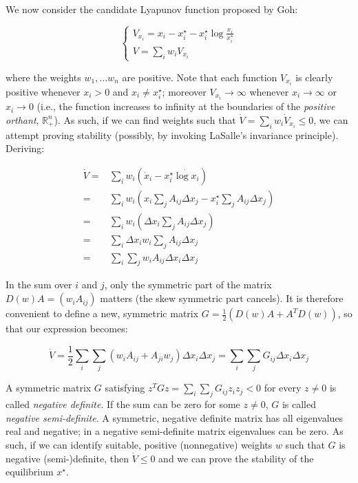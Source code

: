 \documentclass{article}
\begin{document}
We now consider the candidate Lyapunov function proposed by Goh:

\begin{equation}
\label{eq:goh}
\begin{cases}
V_{x_i} = x_i - x_i^\star - x_i^\star \log \frac{x_i}{x_i^\star}\\
V = \sum_i w_i V_{x_i}
\end{cases}
\end{equation}

where the weights \(w_1, \ldots w_n\) are positive. Note that each
function \(V_{x_i}\) is clearly positive whenever \(x_i > 0\) and
\(x_i \neq x_i^\star\); moreover \(V_{x_i} \to \infty\) whenever
\(x_i \to \infty\) or \(x_i \to 0\) (i.e., the function increases to
infinity at the boundaries of the \emph{positive orthant},
\(\mathbb R^n_+\)). As such, if we can find weights such that
\(\dot{V} = \sum_i w_i \dot{V}_{x_i} \leq 0\), we can attempt proving
stability (possibly, by invoking LaSalle's invariance principle).
Deriving:

\begin{equation}
\label{eq:gohstab}
\begin{aligned}
\dot{V} =& \sum_i w_i \left(\dot{x}_i - x_i^\star \dot{\log x_i} \right)\\
 =& \sum_i w_i \left(x_i \sum_{j} A_{ij} \Delta x_j - x_i^\star \sum_j A_{ij} \Delta x_j \right)\\
 =& \sum_i w_i \left(\Delta x_i \sum_{j} A_{ij} \Delta x_j \right)\\
 =& \sum_i \Delta x_i w_i \sum_j A_{ij} \Delta x_j\\
 =& \sum_i \sum_j w_i A_{ij} \Delta x_i \Delta x_j
\end{aligned}
\end{equation}

In the sum over \(i\) and \(j\), only the symmetric part of the matrix
\(D(w) A = (w_i A_{ij})\) matters (the skew symmetric part cancels). It
is therefore convenient to define a new, symmetric matrix
\(G =\frac{1}{2} (D(w)A + A^T D(w))\), so that our expression becomes:

\begin{equation}
\label{eq:stabcond}
\dot{V} = \frac{1}{2}\sum_i \sum_j (w_i A_{ij} + A_{ji} w_j) \Delta x_i \Delta x_j = \sum_i \sum_j G_{ij} \Delta x_i \Delta x_j
\end{equation}

A symmetric matrix \(G\) satisfying
\(z^T G z = \sum_i \sum_j G_{ij} z_i z_j < 0\) for every \(z \neq 0\) is
called \emph{negative definite}. If the sum can be zero for some
\(z \neq 0\), \(G\) is called \emph{negative semi-definite}. A
symmetric, negative definite matrix has all eigenvalues real and
negative; in a negative semi-definite matrix eigenvalues can be zero. As
such, if we can identify suitable, positive (nonnegative) weights \(w\)
such that \(G\) is negative (semi-)definite, then \(\dot{V} \leq 0\) and
we can prove the stability of the equilibrium \(x^\star\).
\end{document}

